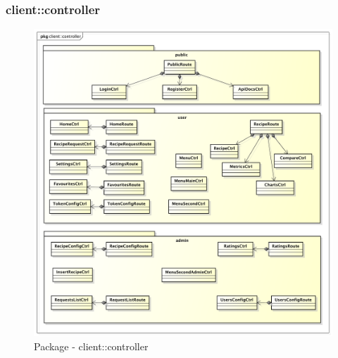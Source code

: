 %


\subsubsection{client::controller} %
\label{ssub:bdsm_app_client_controller}
\begin{figure}[htbp]
	\centering
	\centerline{\includegraphics[scale=0.4]{./images/client/client_controller.pdf}}
	\caption{Package - client::controller}
\end{figure}

